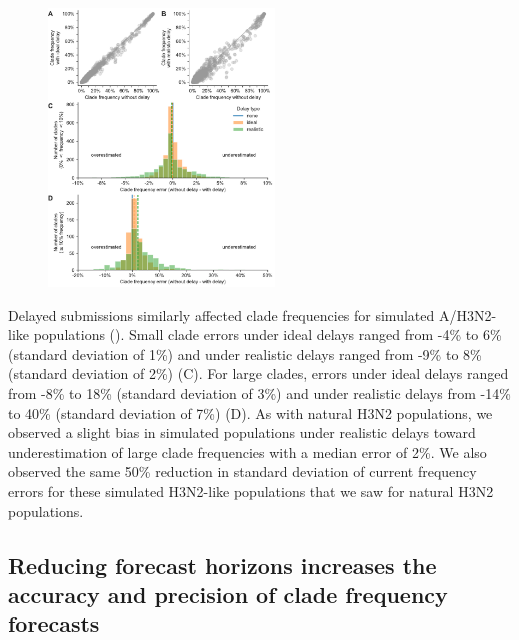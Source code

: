 \documentclass[9pt,lineno]{elife}
\begin{document}
\begin{figure}[htb!]
{\includegraphics[width=6cm]{figures/simulated_current_frequency_errors_by_delay}}\label{figsupp:simulated_current_clade_frequency_errors}
%
\label{figdata:h3n2_tip_attributes}
\label{figsrccode:current_clade_frequency_errors}
\end{figure}

Delayed submissions similarly affected clade frequencies for simulated A/H3N2-like populations ().
Small clade errors under ideal delays ranged from -4\% to 6\% (standard deviation of 1\%) and under realistic delays ranged from -9\% to 8\% (standard deviation of 2\%) (C).
For large clades, errors under ideal delays ranged from -8\% to 18\% (standard deviation of 3\%) and under realistic delays from -14\% to 40\% (standard deviation of 7\%) (D).
As with natural H3N2 populations, we observed a slight bias in simulated populations under realistic delays toward underestimation of large clade frequencies with a median error of 2\%.
We also observed the same 50\% reduction in standard deviation of current frequency errors for these simulated H3N2-like populations that we saw for natural H3N2 populations.

\subsection{Reducing forecast horizons increases the accuracy and precision of clade frequency forecasts}
\end{document}
